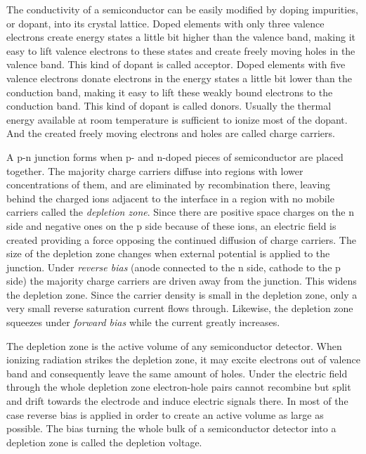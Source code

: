 The conductivity of a semiconductor can be easily modified by doping impurities, or dopant, into its crystal lattice. Doped elements with only three valence electrons create energy states a little bit higher than the valence band, making it easy to lift valence electrons to these states and create freely moving holes in the valence band. This kind of dopant is called acceptor. Doped elements with five valence electrons donate electrons in the energy states a little bit lower than the conduction band, making it easy to lift these weakly bound electrons to the conduction band. This kind of dopant is called donors. Usually the thermal energy available at room temperature is sufficient to ionize most of the dopant. And the created freely moving electrons and holes are called charge carriers.

A p-n junction forms when p- and n-doped pieces of semiconductor are placed together. The majority charge carriers diffuse into regions with lower concentrations of them, and are eliminated by recombination there, leaving behind the charged ions adjacent to the interface in a region with no mobile carriers called the \emph{depletion zone}. Since there are positive space charges on the n side and negative ones on the p side because of these ions, an electric field is created providing a force opposing the continued diffusion of charge carriers. The size of the depletion zone changes when external potential is applied to the junction. Under \emph{reverse bias} (anode connected to the n side, cathode to the p side) the majority charge carriers are driven away from the junction. This widens the depletion zone. Since the carrier density is small in the depletion zone, only a very small reverse saturation current flows through. Likewise, the depletion zone squeezes under \emph{forward bias} while the current greatly increases.

The depletion zone is the active volume of any semiconductor detector. When ionizing radiation strikes the depletion zone, it may excite  electrons out of valence band and consequently leave the same amount of holes. Under the electric field through the whole depletion zone electron-hole pairs cannot recombine but split and drift towards the electrode and induce electric signals there. In most of the case reverse bias is applied in order to create an active volume as large as possible. The bias turning the whole bulk of a semiconductor detector into a depletion zone is called the depletion voltage.

